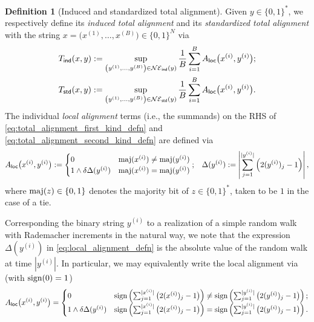 \documentclass[11pt]{amsart}
\numberwithin{equation}{section}
\numberwithin{equation}{section}
\newcommand{\1}{\mathbbm{1}}
\newcommand{\maj}{\textup{maj}}
\newcommand{\sign}{\textup{sign}}
\newcommand{\ind}{\textup{\textsf{ind}}}
\newcommand{\std}{\textup{\textsf{std}}}
\newcommand{\loc}{\textup{\textsf{loc}}}
\theoremstyle{definition}
\newtheorem{definition}[theorem]{Definition}
\begin{document}
\begin{definition}[Induced and standardized total alignment] \label{defn:alignment_fcns}
    Given $y \in \{0,1\}^*$, we respectively define its
    \emph{induced total alignment} and its \emph{standardized total alignment} with the string $x = \big(x^{(1)}, \dots, x^{(B)}\big) \in \{0,1\}^{N}$ via 
    \begin{align}
        & T_\ind\!\left( x, y \right) := \sup_{\left( y^{(1)}, \dots, y^{(B)} \right) \in \mathcal{NE}_\ind\left( y \right)} \frac{1}{B} \sum_{i=1}^B A_\loc\big( x^{(i)}, y^{(i)}\big); \label{eq:total_alignment_first_kind_defn} \\
        & T_\std\!\left( x, y \right) := \sup_{\left( y^{(1)}, \dots, y^{(B)} \right) \in \mathcal{NE}_\std\left( y \right)} \frac{1}{B} \sum_{i=1}^B A_\loc\big( x^{(i)}, y^{(i)}\big). \label{eq:total_alignment_second_kind_defn}
    \end{align}
    The individual \emph{local alignment} terms (i.e., the summands) on the RHS of \eqref{eq:total_alignment_first_kind_defn} and \eqref{eq:total_alignment_second_kind_defn} are defined via
    \begin{align} \label{eq:local_alignment_defn}
         & A_\loc\big( x^{(i)}, y^{(i)} \big) := \begin{cases}
             0 & \maj(x^{(i)}) \neq \maj(y^{(i)}) \\
             1 \land \delta \Delta(y^{(i)}) & \maj(x^{(i)}) = \maj(y^{(i)})
         \end{cases};
         & \Delta(y^{(i)}) := \left| \sum_{j=1}^{|y^{(i)}|} \left( 2( y^{(i)})_j - 1 \right) \right|,
    \end{align}
    where $\maj(z) \in \{0,1\}$ denotes the majority bit of $z \in \{0,1\}^*$, taken to be $1$ in the case of a tie.
\end{definition}
Corresponding the binary string $y^{(i)}$ to a realization of a simple random walk with Rademacher increments in the natural way, we note that the expression $\Delta(y^{(i)})$ in \eqref{eq:local_alignment_defn} is the absolute value of the random walk at time $|y^{(i)}|$. In particular, we may equivalently write the local alignment via (with $\sign(0) = 1$)
\begin{align} \label{eq:local_alignment_SRW}
    A_\loc\big(x^{(i)}, y^{(i)}\big) = \begin{cases}
         0 & \sign\left( \sum_{j=1}^{|x^{(i)}|} \left( 2( x^{(i)} )_j - 1 \right) \right) \neq \sign\left( \sum_{j=1}^{|y^{(i)}|} \left( 2( y^{(i)})_j - 1 \right) \right); \\
         1 \land \delta \Delta(y^{(i)}) & \sign\left( \sum_{j=1}^{|x^{(i)}|} \left( 2( x^{(i)} )_j - 1 \right) \right) = \sign\left( \sum_{j=1}^{|y^{(i)}|} \left( 2( y^{(i)} )_j - 1 \right) \right).
     \end{cases}
\end{align}
\end{document}
